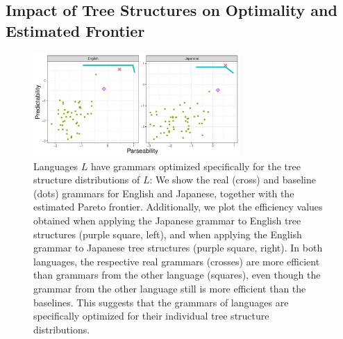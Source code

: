 \documentclass[10pt,twoside,lineno]{article}
\begin{document}
\subsection{Impact of Tree Structures on Optimality and Estimated Frontier}

\begin{figure}
\centering
	\includegraphics[width=0.7\textwidth]{../results/plane/pareto-plane-other-language.pdf}
	\caption[]{Languages $L$ have grammars optimized specifically for the tree structure distributions of $L$: We show the real (cross) and baseline (dots) grammars for English and Japanese, together with the estimated Pareto frontier. Additionally, we plot the efficiency values obtained when applying the Japanese grammar to English tree structures (purple square, left), and when applying the English grammar to Japanese tree structures (purple square, right). In both languages, the respective real grammars (crosses) are more efficient than grammars from the other language (squares), even though the grammar from the other language still is more efficient than the baselines. This suggests that the grammars of languages are specifically optimized for their individual tree structure distributions.}\label{fig:english-japanese-crossed}
\end{figure}
\end{document}
